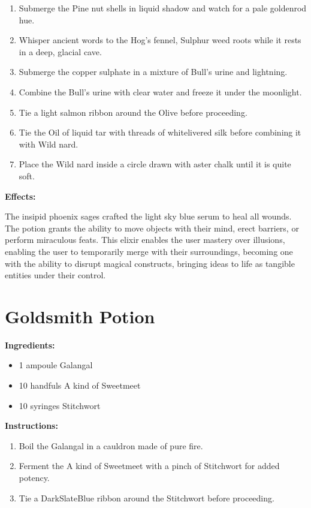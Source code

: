 \documentclass{article}
\begin{document}
\begin{enumerate}
  \item Submerge the Pine nut shells in liquid shadow and watch for a pale goldenrod hue.
  \item Whisper ancient words to the Hog's fennel, Sulphur weed roots while it rests in a deep, glacial cave.
  \item Submerge the copper sulphate in a mixture of Bull's urine and lightning.
  \item Combine the Bull's urine with clear water and freeze it under the moonlight.
  \item Tie a light salmon ribbon around the Olive before proceeding.
  \item Tie the Oil of liquid tar with threads of whitelivered silk before combining it with Wild nard.
  \item Place the Wild nard inside a circle drawn with aster chalk until it is quite soft.
\end{enumerate}

\textbf{Effects:}

The insipid phoenix sages crafted the light sky blue serum to heal all wounds. The potion grants the ability to move objects with their mind, erect barriers, or perform miraculous feats. This elixir enables the user mastery over illusions, enabling the user to temporarily merge with their surroundings, becoming one with the ability to disrupt magical constructs, bringing ideas to life as tangible entities under their control.

\newpage
\section*{Goldsmith Potion}

\textbf{Ingredients:}

\begin{itemize}
  \item 1 ampoule Galangal
  \item 10 handfuls A kind of Sweetmeet
  \item 10 syringes Stitchwort
\end{itemize}

\textbf{Instructions:}

\begin{enumerate}
  \item Boil the Galangal in a cauldron made of pure fire.
  \item Ferment the A kind of Sweetmeet with a pinch of Stitchwort for added potency.
  \item Tie a DarkSlateBlue ribbon around the Stitchwort before proceeding.
\end{enumerate}
\end{document}
